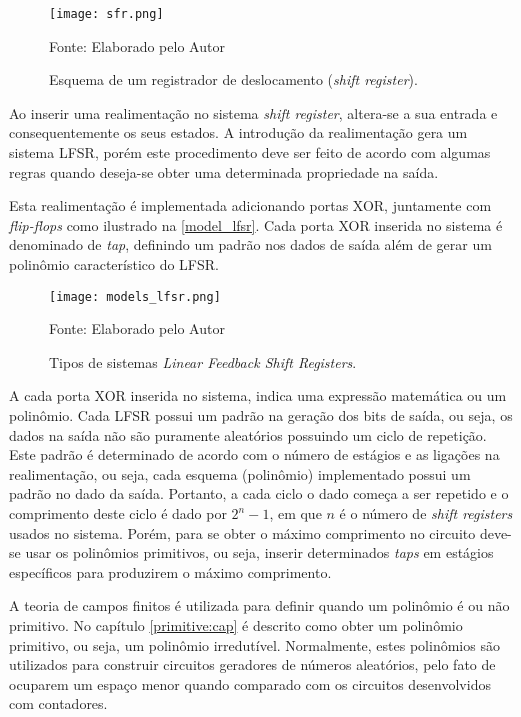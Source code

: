 \begin{figure}[H]
	\caption{\label{sfr}Esquema de um registrador de deslocamento (\textit{shift register}).}
	\centering
	\texttt{[image: sfr.png]}
	\begin{center}
		Fonte: Elaborado pelo Autor
	\end{center}	
\end{figure}

Ao inserir uma realimentação no sistema \textit{shift register}, altera-se a sua entrada e consequentemente os seus estados. A introdução da realimentação gera um sistema LFSR, porém este procedimento deve ser feito de acordo com algumas regras quando deseja-se obter uma determinada propriedade na saída.

Esta realimentação é implementada adicionando portas XOR, juntamente com \textit{flip-flops} como ilustrado na \autoref{model_lfsr}. Cada porta XOR inserida no sistema é denominado de \textit{tap}, definindo um padrão nos dados de saída além de gerar um polinômio característico do LFSR.

\begin{figure}[H]
	\caption{\label{model_lfsr}Tipos de sistemas \textit{Linear Feedback Shift Registers}.}
	\centering
	\texttt{[image: models\_lfsr.png]}
	\begin{center}
		Fonte: Elaborado pelo Autor
	\end{center}	
\end{figure}

A cada porta XOR inserida no sistema, indica uma expressão matemática ou um polinômio. Cada LFSR possui um padrão na geração dos bits de saída, ou seja, os dados na saída não são puramente aleatórios possuindo um ciclo de repetição. Este padrão é determinado de acordo com o número de estágios e as ligações na realimentação, ou seja, cada esquema (polinômio) implementado possui um padrão no dado da saída. Portanto, a cada ciclo o dado começa a ser repetido e o comprimento deste ciclo é dado por $2^{n} - 1$, em que $n$ é o número de \textit{shift registers} usados no sistema. Porém, para se obter o máximo comprimento no circuito deve-se usar os polinômios primitivos, ou seja, inserir determinados \textit{taps} em  estágios específicos para produzirem o máximo comprimento. 

A teoria de campos finitos é utilizada para definir quando um polinômio é ou não primitivo. No capítulo \ref{primitive:cap} é descrito como obter um polinômio primitivo, ou seja, um polinômio irredutível. Normalmente, estes polinômios são utilizados para construir circuitos geradores de números aleatórios, pelo fato de ocuparem um espaço menor quando comparado com os circuitos desenvolvidos com contadores.

